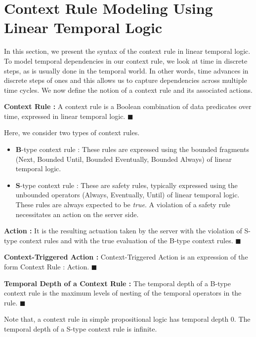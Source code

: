 \section{Context Rule Modeling Using Linear Temporal Logic}\label{seclc}
\noindent
In this section, we present the syntax of the context rule in linear temporal logic. 
To model temporal dependencies in our context rule, we look at time in discrete steps, as is usually done in the temporal world. In other
words, time advances in discrete steps of ones and this allows us to capture dependencies across multiple time cycles. 
We now define the notion of a context rule and its associated actions.
\begin{definition}{\textbf{Context Rule :}} 
 A context rule is a Boolean combination of data predicates over time, 
 expressed in linear temporal logic. 
 \hfill $\blacksquare$
\end{definition}
Here, we consider two types of context rules.
\begin{itemize}
\item \textbf{B}-type context rule : These rules are expressed using the bounded fragments 
(Next, Bounded Until, Bounded Eventually, Bounded Always) of linear temporal logic.
 \item \textbf{S}-type context rule : These are safety rules, typically expressed using the unbounded operators (Always, Eventually, Until) 
 of linear temporal logic. These rules are always expected to be {\em{true}}. 
 A violation of a safety rule necessitates an action on the server side.
 
\end{itemize}
\begin{definition}{\textbf{Action :}} 
 It is the resulting actuation taken by the server with the violation of S-type context rules and with the true evaluation 
 of the B-type context rules. 
 \hfill $\blacksquare$
\end{definition}
\vspace{1.5mm}
\begin{definition}{\textbf{Context-Triggered Action :}} 
 Context-Triggered Action is an expression of the form Context Rule : Action. 
 \hfill $\blacksquare$
\end{definition}
\vspace{1.5mm}
\begin{definition}{\textbf{Temporal Depth of a Context Rule :}} 
 The temporal depth of a B-type context rule is the maximum levels of nesting of the temporal operators in the rule.  
 \hfill $\blacksquare$
\end{definition}
\vspace{1.5mm}
\noindent
Note that, a context rule in simple propositional logic has temporal depth 0.
The temporal depth of a S-type context rule is infinite.

